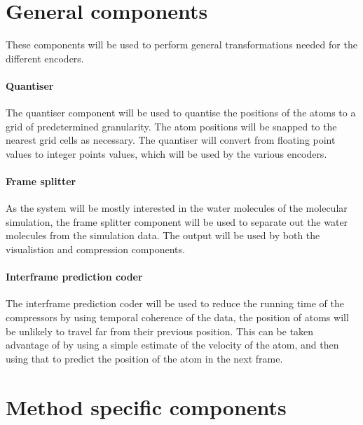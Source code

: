 \section{General components}
\label{sec:generalcomponents}

These components will be used to perform general transformations needed for the
different encoders.

\paragraph{Quantiser}

The quantiser component will be used to quantise the positions of the atoms to
a grid of predetermined granularity. The atom positions will be snapped to the
nearest grid cells as necessary. The quantiser will convert from floating point
values to integer points values, which will be used by the various encoders.


\paragraph{Frame splitter}

As the system will be mostly interested in the water molecules of the molecular
simulation, the frame splitter component will be used to separate out the water
molecules from the simulation data. The output will be used by both the
visualistion and compression components.


\paragraph{Interframe prediction coder}

The interframe prediction coder will be used to reduce the running time of the
compressors by using temporal coherence of the data, the position of atoms will
be unlikely to travel far from their previous position. This can be taken
advantage of by using a simple estimate of the velocity of the atom, and then
using that to predict the position of the atom in the next frame.



\section{Method specific components}
\label{sec:methodcomponents}

